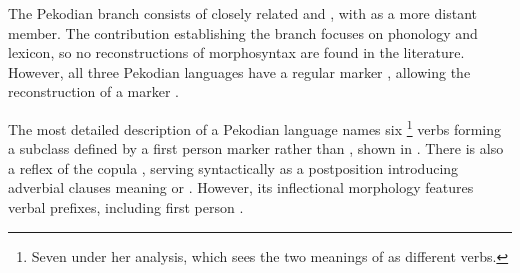 \subsubsection{\PPek {}}
\label{sec:pekodian}
The Pekodian branch consists of closely related \arara and \ikpeng, with \bakairi as a more distant member.
The contribution establishing the branch \parencite{meira2005southern} focuses on phonology and lexicon, so no reconstructions of \PPek morphosyntax are found in the literature.
However, all three Pekodian languages have a regular  marker  , allowing the reconstruction of a \PPek {} marker .




The most detailed description of a Pekodian language \parencite{alves2017arara} names six%
\footnote{Seven under her analysis, which sees the two meanings of   as different verbs.}
\arara {} verbs forming a subclass defined by a first person marker  rather than , shown in .
There is also a reflex of the copula , serving syntactically as a postposition introducing adverbial clauses meaning  or  \parencite[199--201]{alves2017arara}.
However, its inflectional morphology features verbal \setone prefixes, including first person  .

